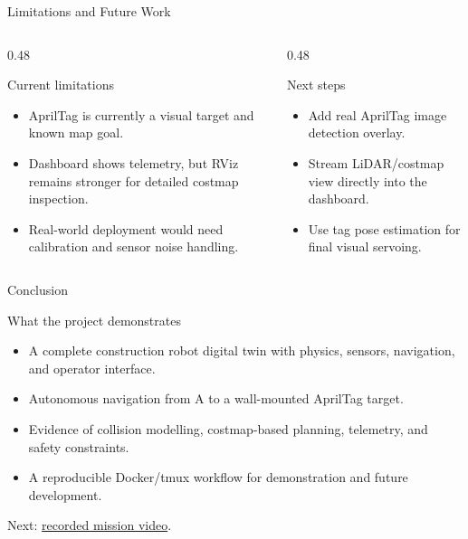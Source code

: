 \documentclass[aspectratio=169,11pt]{beamer}
\begin{document}
\begin{frame}{Limitations and Future Work}
  \begin{columns}[T,onlytextwidth]
    \begin{column}{0.48\textwidth}
      \begin{block}{Current limitations}
        \begin{itemize}
          \item AprilTag is currently a visual target and known map goal.
          \item Dashboard shows telemetry, but RViz remains stronger for detailed costmap inspection.
          \item Real-world deployment would need calibration and sensor noise handling.
        \end{itemize}
      \end{block}
    \end{column}
    \begin{column}{0.48\textwidth}
      \begin{block}{Next steps}
        \begin{itemize}
          \item Add real AprilTag image detection overlay.
          \item Stream LiDAR/costmap view directly into the dashboard.
          \item Use tag pose estimation for final visual servoing.
        \end{itemize}
      \end{block}
    \end{column}
  \end{columns}
\end{frame}

\begin{frame}{Conclusion}
  \begin{block}{What the project demonstrates}
    \begin{itemize}
      \item A complete construction robot digital twin with physics, sensors, navigation, and operator interface.
      \item Autonomous navigation from A to a wall-mounted AprilTag target.
      \item Evidence of collision modelling, costmap-based planning, telemetry, and safety constraints.
      \item A reproducible Docker/tmux workflow for demonstration and future development.
    \end{itemize}
  \end{block}

  \vspace{0.8em}
  \begin{center}
    \Large Next: \href{pj4.webm}{recorded mission video}.
  \end{center}
\end{frame}
\end{document}
